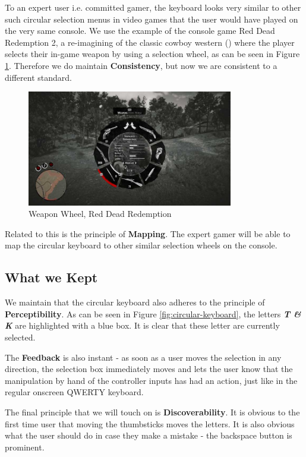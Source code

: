 \documentclass[
	letterpaper, %
]{jdf}
\begin{document}
To an expert user i.e. committed gamer, the keyboard looks very similar to other such circular selection menus in video games that the user would have played on the very same console. We use the example of the console game Red Dead Redemption 2, a re-imagining of the classic cowboy western (\cite{schwartz_2018}) where the player selects their in-game weapon by using a selection wheel, as can be seen in Figure \ref{fig:weapon-wheel}. Therefore we do maintain \textbf{Consistency}, but now we are consistent to a different standard.

\begin{figure}[h]
	\centering
	\includegraphics[width=9cm]{jdf-master/Figures/weapon-wheel-red-dead-redemption-2.jpg}
	\caption{Weapon Wheel, Red Dead Redemption}
	\label{fig:weapon-wheel}
\end{figure}


Related to this is the principle of \textbf{Mapping}. The expert gamer will be able to map the circular keyboard to other similar selection wheels on the console.




\subsection{What we Kept}

We maintain that the circular keyboard also adheres to the principle of \textbf{Perceptibility}. As can be seen in Figure \ref{fig:circular-keyboard}, the letters \textbf{\textit{T \& K}} are highlighted with a blue box. It is clear that these letter are currently selected. 

The \textbf{Feedback} is also instant - as soon as a user moves the selection in any direction, the selection box immediately moves and lets the user know that the manipulation by hand of the controller inputs has had an action, just like in the regular onscreen QWERTY keyboard.

The final principle that we will touch on is \textbf{Discoverability}. It is obvious to the first time user that moving the thumbsticks moves the letters. It is also obvious what the user should do in case they make a mistake - the backspace button is prominent.
\end{document}
